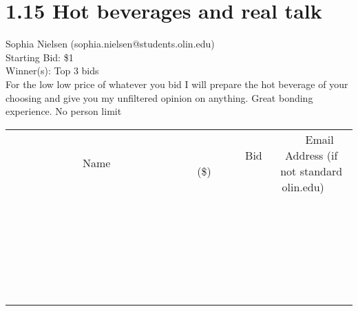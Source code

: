 \documentclass[11pt]{article}
\begin{document}
\section*{1.15 Hot beverages and real talk}
Sophia Nielsen (sophia.nielsen@students.olin.edu) \\
Starting Bid: \$1 \\
Winner(s): 
Top 3 bids \\
For the low low price of whatever you bid I will prepare the hot beverage of your choosing and give you my unfiltered opinion on anything. Great bonding experience. No person limit \\[6ex]
\begin{tabular}{c c c}
~~~~~~~~~~~~~Name~~~~~~~~~~~~~ & ~~~~~~~~~Bid (\$)~~~~~~~~~ & ~~~Email Address (if not standard olin.edu)~~~ \\
 & & \\
\hline
 & & \\
\hline
 & & \\
\hline
 & & \\
\hline
 & & \\
\hline
 & & \\
\hline
 & & \\
\hline
 & & \\
\hline
 & & \\
\hline
 & & \\
\hline
 & & \\
\hline
 & & \\
\hline
 & & \\
\hline
 & & \\
\hline
 & & \\
\hline
 & & \\
\hline
 & & \\
\hline
 & & \\
\hline
 & & \\
\hline
 & & \\
\hline
 & & \\
\hline
 & & \\
\hline
 & & \\
\hline
 & & \\
\hline
 & & \\
\hline
 & & \\
\hline
\end{tabular}
\clearpage
\end{document}
